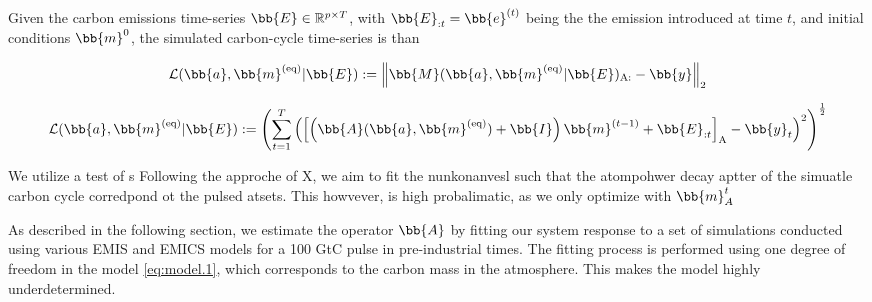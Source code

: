 \newpage
Given the carbon emissions time-series $\bb{E} \in \mathbb{R}^{p \times T}$, with $\bb{E}_{:t}=\bb{e}^{(t)}$ being the the emission introduced at time $t$, and initial conditions $\bb{m}^{0}$, the simulated carbon-cycle time-series is than 
%




\begin{align}
	\mathcal{L}(\bb{a},\bb{m}^{(\text{eq})}|\bb{E}) :=  \left\|    \bb{M}(\bb{a},\bb{m}^{(\text{eq})}|\bb{E}) _{\text{A}:}   - \bb{y}    \right\|_2
\end{align}


\begin{align}
	\mathcal{L}(\bb{a},\bb{m}^{(\text{eq})}|\bb{E}) :=  \left ( \sum_{t=1}^{T}  \left( \left[  \left( \bb{A}(\bb{a},\bb{m}^{(\text{eq})} )+\bb{I} \right) \bb{m}^{(t-1)} + \bb{E}_{:t} \right]_{\text{A}}  - \bb{y}_{t} \right)^{2} \right)^{\frac{1}{2}}
\end{align}








\newpage

We utilize a test of s
Following the approche of X, we aim to fit the nunkonanvesl such that the atompohwer decay aptter of the simuatle carbon cycle corredpond ot the pulsed atsets. 
This howvever, is high probalimatic, as we only optimize with  $\bb{m}^{t}_{A}$

As described in the following section, we estimate the operator $\bb{A}$ by fitting our system response to a set of simulations conducted using various EMIS and EMICS models for a 100 GtC pulse in pre-industrial times. The fitting process is performed using one degree of freedom in the model \eqref{eq:model.1}, which corresponds to the carbon mass in the atmosphere. This makes the model highly underdetermined. 










